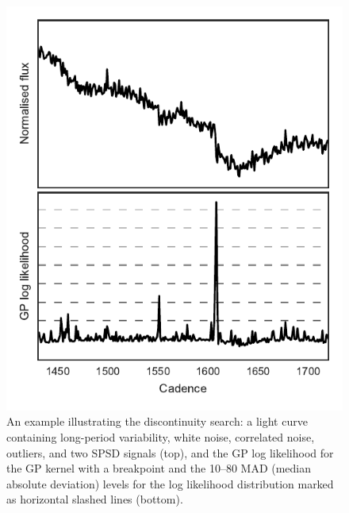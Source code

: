 \documentclass[useAMS,usenatbib]{mn2e}
\begin{document}
\begin{figure}
 \centering
 \includegraphics[width=\columnwidth]{pub_jump_identification.pdf}
 \caption{An example illustrating the discontinuity search: 
  a light curve containing long-period variability, white noise,
  correlated noise, outliers, and two SPSD signals (top),
  and the GP log likelihood for the GP kernel with a breakpoint and the 10--80 MAD (median absolute deviation) levels for the log likelihood distribution 
  marked as horizontal slashed lines (bottom).}
 \label{fig:jump_identification}
\end{figure}
\end{document}
